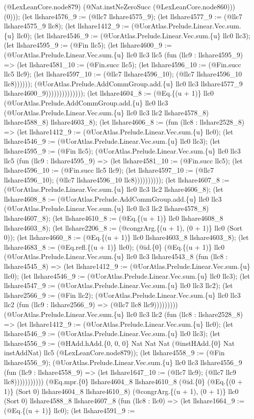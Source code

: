 \documentclass[11pt]{article}
\begin{document}
(@LexLeanCore.node879) (@Nat.instNeZeroSucc (@LexLeanCore.node860))) (0))); (let llshare4576\_9 := (@llc7 llshare4575\_9); (let llshare4577\_9 := (@llc7 llshare4575\_9 llc8); (let llshare1412\_9 := (@UorAtlas.Prelude.Linear.Vec.sum.\{u\} llc0); (let llshare4546\_9 := (@UorAtlas.Prelude.Linear.Vec.sum.\{u\} llc0 llc3); (let llshare4595\_9 := (@Fin llc5); (let llshare4600\_9 := (@UorAtlas.Prelude.Linear.Vec.sum.\{u\} llc0 llc3 llc5 (fun (llc9 : llshare4595\_9) => (let llshare4581\_10 := (@Fin.succ llc5); (let llshare4596\_10 := (@Fin.succ llc5 llc9); (let llshare4597\_10 := (@llc7 llshare4596\_10); (@llc7 llshare4596\_10 llc8)))))); (@UorAtlas.Prelude.AddCommGroup.add.\{u\} llc0 llc3 llshare4577\_9 llshare4600\_9)))))))))))))); (let llshare4604\_8 := (@Eq.\{(u + 1)\} llc0 (@UorAtlas.Prelude.AddCommGroup.add.\{u\} llc0 llc3 (@UorAtlas.Prelude.Linear.Vec.sum.\{u\} llc0 llc3 llc2 llshare4578\_8) llshare4588\_8) llshare4603\_8); (let llshare4606\_8 := (fun (llc8 : llshare2528\_8) => (let llshare1412\_9 := (@UorAtlas.Prelude.Linear.Vec.sum.\{u\} llc0); (let llshare4546\_9 := (@UorAtlas.Prelude.Linear.Vec.sum.\{u\} llc0 llc3); (let llshare4595\_9 := (@Fin llc5); (@UorAtlas.Prelude.Linear.Vec.sum.\{u\} llc0 llc3 llc5 (fun (llc9 : llshare4595\_9) => (let llshare4581\_10 := (@Fin.succ llc5); (let llshare4596\_10 := (@Fin.succ llc5 llc9); (let llshare4597\_10 := (@llc7 llshare4596\_10); (@llc7 llshare4596\_10 llc8)))))))))); (let llshare4607\_8 := (@UorAtlas.Prelude.Linear.Vec.sum.\{u\} llc0 llc3 llc2 llshare4606\_8); (let llshare4608\_8 := (@UorAtlas.Prelude.AddCommGroup.add.\{u\} llc0 llc3 (@UorAtlas.Prelude.Linear.Vec.sum.\{u\} llc0 llc3 llc2 llshare4578\_8) llshare4607\_8); (let llshare4610\_8 := (@Eq.\{(u + 1)\} llc0 llshare4608\_8 llshare4603\_8); (let llshare2206\_8 := (@congrArg.\{(u + 1), (0 + 1)\} llc0 (Sort 0)); (let llshare4660\_8 := (@Eq.\{(u + 1)\} llc0 llshare4603\_8 llshare4603\_8); (let llshare4683\_8 := (@Eq.refl.\{(u + 1)\} llc0); (@id.\{0\} (@Eq.\{(u + 1)\} llc0 (@UorAtlas.Prelude.Linear.Vec.sum.\{u\} llc0 llc3 llshare4543\_8 (fun (llc8 : llshare4545\_8) => (let llshare1412\_9 := (@UorAtlas.Prelude.Linear.Vec.sum.\{u\} llc0); (let llshare4546\_9 := (@UorAtlas.Prelude.Linear.Vec.sum.\{u\} llc0 llc3); (let llshare4547\_9 := (@UorAtlas.Prelude.Linear.Vec.sum.\{u\} llc0 llc3 llc2); (let llshare2566\_9 := (@Fin llc2); (@UorAtlas.Prelude.Linear.Vec.sum.\{u\} llc0 llc3 llc2 (fun (llc9 : llshare2566\_9) => (@llc7 llc8 llc9))))))))) (@UorAtlas.Prelude.Linear.Vec.sum.\{u\} llc0 llc3 llc2 (fun (llc8 : llshare2528\_8) => (let llshare1412\_9 := (@UorAtlas.Prelude.Linear.Vec.sum.\{u\} llc0); (let llshare4546\_9 := (@UorAtlas.Prelude.Linear.Vec.sum.\{u\} llc0 llc3); (let llshare4556\_9 := (@HAdd.hAdd.\{0, 0, 0\} Nat Nat Nat (@instHAdd.\{0\} Nat instAddNat) llc5 (@LexLeanCore.node879)); (let llshare4558\_9 := (@Fin llshare4556\_9); (@UorAtlas.Prelude.Linear.Vec.sum.\{u\} llc0 llc3 llshare4556\_9 (fun (llc9 : llshare4558\_9) => (let llshare1647\_10 := (@llc7 llc9); (@llc7 llc9 llc8))))))))))) (@Eq.mpr.\{0\} llshare4604\_8 llshare4610\_8 (@id.\{0\} (@Eq.\{(0 + 1)\} (Sort 0) llshare4604\_8 llshare4610\_8) (@congrArg.\{(u + 1), (0 + 1)\} llc0 (Sort 0) llshare4588\_8 llshare4607\_8 (fun (llc8 : llc0) => (let llshare1664\_9 := (@Eq.\{(u + 1)\} llc0); (let llshare4591\_9 := 
\end{document}
